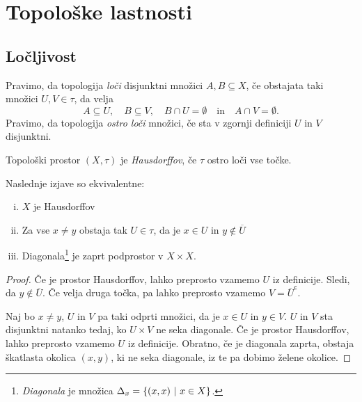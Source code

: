 \section{Topološke lastnosti}

\subsection{Ločljivost}


\begin{definicija}
Pravimo, da topologija
\emph{loči} disjunktni množici
$A, B \subseteq X$, če obstajata taki množici $U, V \in \tau$, da
velja
\[
A \subseteq U,\quad B \subseteq V,\quad B \cap U = \emptyset
\quad \text{in} \quad
A \cap V = \emptyset.
\]
Pravimo, da topologija \emph{ostro loči} množici, če sta v zgornji
definiciji $U$ in $V$ disjunktni.
\end{definicija}

\begin{definicija}
Topološki prostor $(X, \tau)$ je
\emph{Hausdorffov}, če
$\tau$ ostro loči vse točke.
\end{definicija}

\begin{trditev}
Naslednje izjave so ekvivalentne:

\begin{enumerate}[i)]
\item $X$ je Hausdorffov
\item Za vse $x \ne y$ obstaja tak $U \in \tau$, da je $x \in U$ in
$y \not \in \overline{U}$
\item Diagonala\footnote{\emph{Diagonala} je množica
$\Delta_x = \left\{(x,x)~\middle\vert~x \in X\right\}$.} je zaprt podprostor v
$X \times X$.
\end{enumerate}
\end{trditev}

\begin{proof}
Če je prostor Hausdorffov, lahko preprosto vzamemo $U$ iz
definicije. Sledi, da $y \not \in \overline{U}$. Če velja druga
točka, pa lahko preprosto vzamemo $V = \overline{U}^{\mathsf{c}}$.

Naj bo $x \ne y$, $U$ in $V$ pa taki odprti množici, da je
$x \in U$ in $y \in V$. $U$ in $V$ sta disjunktni natanko tedaj, ko
$U \times V$ ne seka diagonale. Če je prostor Hausdorffov, lahko
preprosto vzamemo $U$ iz definicije. Obratno, če je diagonala
zaprta, obstaja škatlasta okolica $(x,y)$, ki ne seka diagonale,
iz te pa dobimo želene okolice.
\end{proof}

